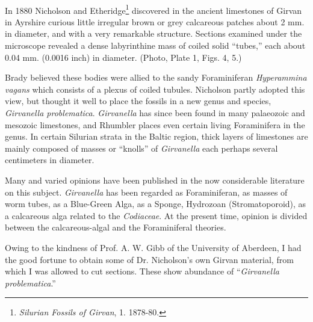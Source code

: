 \documentclass[a4paper, 12pt, oneside, landscape]{article}
\begin{document}
\paragraph{}
In 1880 Nicholson and Etheridge\footnote{\emph{Silurian Fossils of Girvan}, 1. 1878-80.} discovered in the ancient limestones of Girvan in Ayrshire curious little irregular brown or grey calcareous patches about 2 mm. in diameter, and with a very remarkable structure. Sections examined under the microscope revealed a dense labyrinthine mass of coiled solid ``tubes,'' each about 0.04 mm. (0.0016 inch) in diameter. (Photo, Plate 1, Figs. 4, 5.)

Brady believed these bodies were allied to the sandy Foraminiferan \emph{Hyperammina vagans} which consists of a plexus of coiled tubules. Nicholson partly adopted this view, but thought it well to place the fossils in a new genus and species, \emph{Girvanella problematica}. \emph{Girvanella} has since been found in many palaeozoic and mesozoic limestones, and Rhumbler places even certain living Foraminifera in the genus. In certain Silurian strata in the Baltic region, thick layers of limestones are mainly composed of masses or ``knolls'' of \emph{Girvanella} each perhaps several centimeters in diameter.

Many and varied opinions have been published in the now considerable literature on this subject. \emph{Girvanella} has been regarded as Foraminiferan, as masses of worm tubes, as a Blue-Green Alga, as a Sponge, Hydrozoan (Stromatoporoid), as a calcareous alga related to the \emph{Codiaceae}. At the present time, opinion is divided between the calcareous-algal and the Foraminiferal theories.

Owing to the kindness of Prof. A. W. Gibb of the University of Aberdeen, I had the good fortune to obtain some of Dr. Nicholson's own Girvan material, from which I was allowed to cut sections. These show abundance of ``\emph{Girvanella problematica}.''
\end{document}
